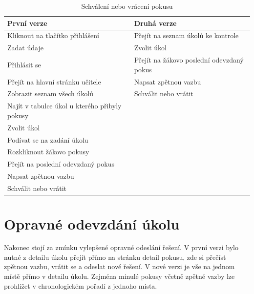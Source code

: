 \documentclass[twoside]{ctuthesis}
\theoremstyle{plain}
\theoremstyle{definition}
\theoremstyle{note}
\begin{document}
\begin{table}[H]
    \centering
    \begin{tabular}{ |p{}|p{}| } 
        \hline
        \rowcolor{tabledarkblue}
        První verze & Druhá verze\\
        \hline
        Kliknout na tlačítko přihlášení & Přejít na seznam úkolů ke kontrole \\ 
        Zadat údaje & Zvolit úkol \\ 
        Přihlásit se & Přejít na žákovo poslední odevzdaný pokus\\ 
        Přejít na hlavní stránku učitele & Napsat zpětnou vazbu\\
        Zobrazit seznam všech úkolů & Schválit nebo vrátit\\
        Najít v tabulce úkol u kterého přibyly pokusy & \\
        Zvolit úkol & \\
        Podívat se na zadání úkolu & \\
        Rozkliknout žákovo pokusy & \\
        Přejít na poslední odevzdaný pokus & \\
        Napsat zpětnou vazbu & \\
        Schválit nebo vrátit & \\
        \hline
    \end{tabular}
    \caption{Schválení nebo vrácení pokusu}
    \label{table:acceptOrReturnAttempt}
\end{table}


\section{Opravné odevzdání úkolu}
Nakonec stojí za zmínku vylepšené opravné odeslání řešení. V první verzi bylo nutné z detailu úkolu přejít přímo na stránku detail pokusu, zde si přečíst zpětnou vazbu, vrátit se a odeslat nové řešení. V nové verzi je vše na jednom místě přímo v detailu úkolu. Zejména minulé pokusy včetně zpětné vazby lze prohlížet v chronologickém pořadí z jednoho místa.
\end{document}
